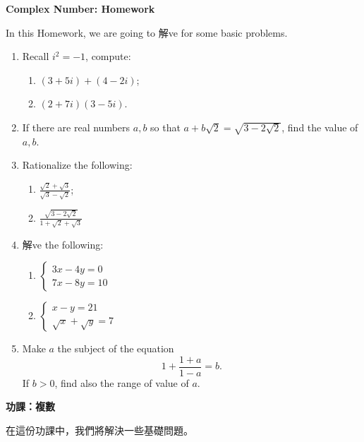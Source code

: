 \documentclass[12pt]{article}
\begin{document}
    \begin{center}
        \textbf{Complex Number: Homework}
    \end{center}

    In this Homework, we are going to 解ve for some basic problems.

    \begin{enumerate}
        \item Recall $i^2=-1$, compute:\begin{enumerate}
            \item $(3+5i)+(4-2i)$;
            \item $(2+7i)(3-5i)$.
        \end{enumerate}
        \item If there are real numbers $a,b$ so that $a+b\sqrt{2}=\sqrt{3-2\sqrt{2}}$, find the value of $a,b$.
        \item Rationalize the following:\begin{enumerate}
            \item $\frac{\sqrt{2}+\sqrt{3}}{\sqrt{3}-\sqrt{2}}$;
            \item $\frac{\sqrt{3-2\sqrt{2}}}{1+\sqrt{2}+\sqrt{3}}$
        \end{enumerate}
        \item 解ve the following: \begin{enumerate}
            \item $\begin{cases}
                3x-4y=0\\
                7x-8y=10
            \end{cases}$
            \item $\begin{cases}
                x-y=21\\
                \sqrt{x}+\sqrt{y}=7
            \end{cases}$
        \end{enumerate}
        \item Make $a$ the subject of the equation $$1+\frac{1+a}{1-a}=b.$$ If $b>0$, find also the range of value of $a$.
    \end{enumerate}

    \newpage

    \begin{center}
        \textbf{功課：複數}
    \end{center}

    在這份功課中，我們將解決一些基礎問題。
\end{document}
